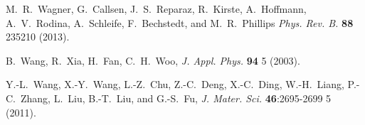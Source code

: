 \documentclass[16pt]{article} %
\begin{document}
\begin{thebibliography}{1}
M.~R.~Wagner, G.~Callsen, J.~S.~Reparaz, R.~Kirste, A.~Hoffmann, A.~V.~Rodina, A.~Schleife, F.~Bechstedt, and M.~R.~Phillips
\newblock \emph{Phys. Rev. B.} \textbf{88} 235210 (2013).

B.~Wang, R.~Xia, H.~Fan, C.~H.~Woo,
\newblock \emph{J. Appl. Phys.} \textbf{94} 5 (2003).

Y.-L.~Wang, X.-Y.~Wang, L.-Z.~Chu, Z.-C.~Deng, X.-C.~Ding, W.-H.~Liang, P.-C.~Zhang, L.~Liu, B.-T.~Liu, and G.-S.~Fu,
\newblock \emph{J. Mater. Sci.} \textbf{46}:2695-2699 5 (2011).

\end{thebibliography}


\end{document}
